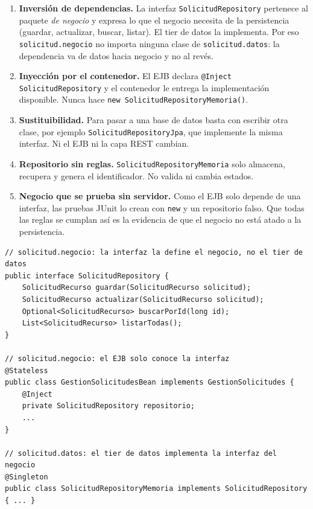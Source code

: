\documentclass[11pt,letterpaper]{article}
\begin{document}
\begin{enumerate}
  \item \textbf{Inversión de dependencias.} La interfaz \texttt{SolicitudRepository}
        pertenece al paquete \emph{de negocio} y expresa lo que el negocio necesita de la
        persistencia (guardar, actualizar, buscar, listar). El tier de datos la implementa.
        Por eso \texttt{solicitud.negocio} no importa ninguna clase de \texttt{solicitud.datos}:
        la dependencia va de datos hacia negocio y no al revés.
  \item \textbf{Inyección por el contenedor.} El EJB declara
        \texttt{@Inject SolicitudRepository} y el contenedor le entrega la implementación
        disponible. Nunca hace \texttt{new SolicitudRepositoryMemoria()}.
  \item \textbf{Sustituibilidad.} Para pasar a una base de datos basta con escribir otra
        clase, por ejemplo \texttt{SolicitudRepositoryJpa}, que implemente la misma interfaz.
        Ni el EJB ni la capa REST cambian.
  \item \textbf{Repositorio sin reglas.} \texttt{SolicitudRepositoryMemoria} solo almacena,
        recupera y genera el identificador. No valida ni cambia estados.
  \item \textbf{Negocio que se prueba sin servidor.} Como el EJB solo depende de una interfaz, las
        pruebas JUnit lo crean con \texttt{new} y un repositorio falso. Que todas las reglas
        se cumplan así es la evidencia de que el negocio no está atado a la persistencia.
\end{enumerate}

\begin{lstlisting}[style=java]
// solicitud.negocio: la interfaz la define el negocio, no el tier de datos
public interface SolicitudRepository {
    SolicitudRecurso guardar(SolicitudRecurso solicitud);
    SolicitudRecurso actualizar(SolicitudRecurso solicitud);
    Optional<SolicitudRecurso> buscarPorId(long id);
    List<SolicitudRecurso> listarTodas();
}

// solicitud.negocio: el EJB solo conoce la interfaz
@Stateless
public class GestionSolicitudesBean implements GestionSolicitudes {
    @Inject
    private SolicitudRepository repositorio;
    ...
}

// solicitud.datos: el tier de datos implementa la interfaz del negocio
@Singleton
public class SolicitudRepositoryMemoria implements SolicitudRepository { ... }
\end{lstlisting}
\end{document}
